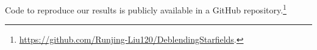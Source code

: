 Code to reproduce our results is publicly available in a GitHub repository.\footnote{
\url{https://github.com/Runjing-Liu120/DeblendingStarfields}.
}




















